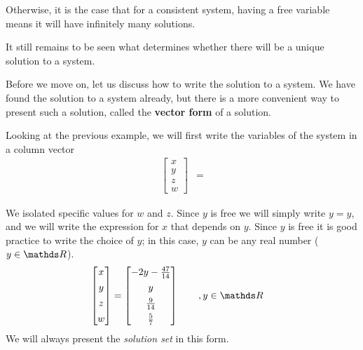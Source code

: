 \documentclass[11pt]{article}
\newcommand{\keyphrase}{\textbf}
\begin{document}
Otherwise, it is the case that for a consistent system, having a free variable means it will have infinitely many solutions.

It still remains to be seen what determines whether there will be a unique solution to a system.

Before we move on, let us discuss how to write the solution to a system. We have found the solution to a system already, but there is a more convenient way to present such a solution, called the \keyphrase{vector form} of a solution.


Looking at the previous example, we will first write the variables of the system in a column vector
\begin{align*}
\begin{bmatrix}
x
\\[.4em]
y
\\[.4em]
z
\\[.4em]
w
\end{bmatrix}
&=
\end{align*}

We isolated specific values for $w$ and $z$. Since $y$ is free we will simply write $y=y$, and we will write the expression for $x$ that depends on $y$. Since $y$ is free it is good practice to write the choice of $y$; in this case, $y$ can be any real number ($y \in \bbR$).
\begin{align*}
\begin{bmatrix}
x
\\[.4em]
y
\\[.4em]
z
\\[.4em]
w
\end{bmatrix}
&=
\begin{bmatrix}
-2y - \frac{47}{14}
\\[.4em]
y
\\[.4em]
\frac{9}{14}
\\[.4em]
\frac{5}{7}
\end{bmatrix}
\qquad , y \in \bbR
\end{align*}
We will always present the \emph{solution set} in this form.
\end{document}
